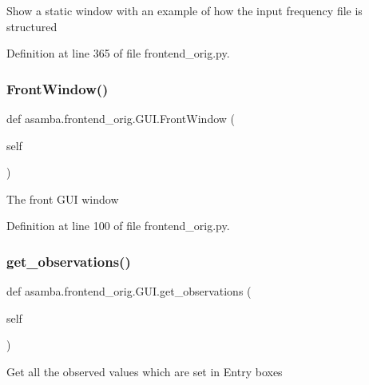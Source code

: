 \begin{DoxyVerb}Show a static window with an example of how the input frequency file is structured \end{DoxyVerb}
 

Definition at line 365 of file frontend\+\_\+orig.\+py.

\mbox{\label{classasamba_1_1frontend__orig_1_1_g_u_i_a0fd564268af273f977bc8065e26e110b}} 
\subsubsection{\texorpdfstring{Front\+Window()}{FrontWindow()}}
{\footnotesize\ttfamily def asamba.\+frontend\+\_\+orig.\+G\+U\+I.\+Front\+Window (\begin{DoxyParamCaption}\item[{}]{self }\end{DoxyParamCaption})}

\begin{DoxyVerb}The front GUI window \end{DoxyVerb}
 

Definition at line 100 of file frontend\+\_\+orig.\+py.

\mbox{\label{classasamba_1_1frontend__orig_1_1_g_u_i_a2115a025361cf5282c72baef51ec0004}} 
\subsubsection{\texorpdfstring{get\+\_\+observations()}{get\_observations()}}
{\footnotesize\ttfamily def asamba.\+frontend\+\_\+orig.\+G\+U\+I.\+get\+\_\+observations (\begin{DoxyParamCaption}\item[{}]{self }\end{DoxyParamCaption})}

\begin{DoxyVerb}Get all the observed values which are set in Entry boxes \end{DoxyVerb}
 

